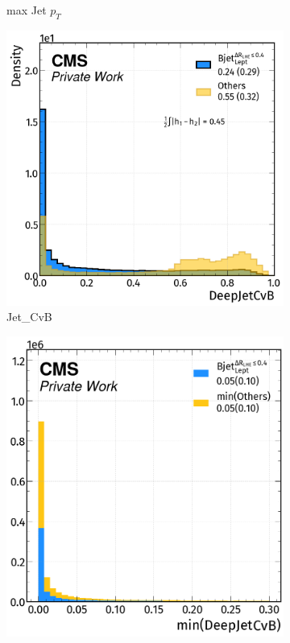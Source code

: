 \begin{figure}[H]
\begin{subfigure}{0.47\linewidth}
        \caption{max Jet $p_T$}
    \end{subfigure}  
    \hfill
    \begin{subfigure}{0.513\linewidth}
        \centering
        \includegraphics[width=1\linewidth]{fig//chap08-kin_reco/cvb.png}
        \caption{Jet\_CvB}
    \end{subfigure}
    \hfill
    \begin{subfigure}{0.47\linewidth}  
        \centering
        \includegraphics[width=1\linewidth]{fig//chap08-kin_reco/min_cvb.png}

\end{subfigure}
\end{figure}
